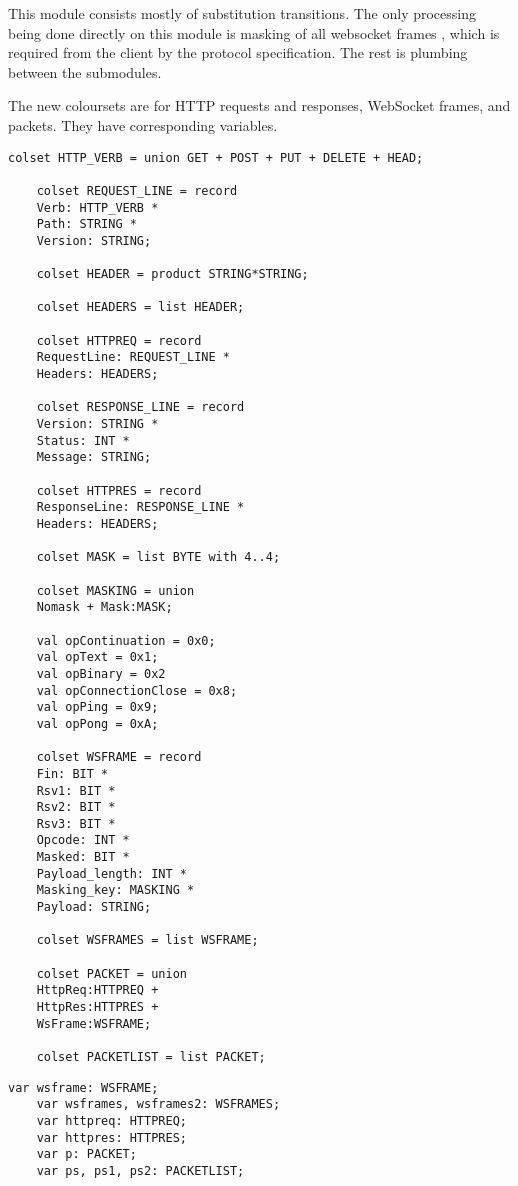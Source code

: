 
	This module consists mostly of substitution transitions. The only processing
	being done directly on this module is masking of all websocket frames
	, which is required from the client by the
	protocol specification.
	The rest is plumbing between the submodules.
	
	The new coloursets are for HTTP requests and responses, WebSocket frames, and
	packets. They have corresponding variables. 
	
	\begin{lstlisting}[label=lst:client_lib_colset,caption=Library colour
	sets,gobble=1]
	colset HTTP_VERB = union GET + POST + PUT + DELETE + HEAD;
	
	colset REQUEST_LINE = record
	Verb: HTTP_VERB *
	Path: STRING *
	Version: STRING;
	
	colset HEADER = product STRING*STRING;
	
	colset HEADERS = list HEADER;
	
	colset HTTPREQ = record
	RequestLine: REQUEST_LINE *
	Headers: HEADERS;
	
	colset RESPONSE_LINE = record
	Version: STRING *
	Status: INT *
	Message: STRING;
	
	colset HTTPRES = record
	ResponseLine: RESPONSE_LINE *
	Headers: HEADERS;
	
	colset MASK = list BYTE with 4..4;
	
	colset MASKING = union
	Nomask + Mask:MASK;
	
	val opContinuation = 0x0;
	val opText = 0x1;
	val opBinary = 0x2
	val opConnectionClose = 0x8;
	val opPing = 0x9;
	val opPong = 0xA;
	
	colset WSFRAME = record
	Fin: BIT *
	Rsv1: BIT *
	Rsv2: BIT *
	Rsv3: BIT *
	Opcode: INT *
	Masked: BIT *
	Payload_length: INT *
	Masking_key: MASKING *
	Payload: STRING;
	
	colset WSFRAMES = list WSFRAME;
	
	colset PACKET = union 
	HttpReq:HTTPREQ + 
	HttpRes:HTTPRES +
	WsFrame:WSFRAME;

	colset PACKETLIST = list PACKET;
	\end{lstlisting}
	
	\begin{lstlisting}[label=lst:client_lib_vars,caption=Library
	variables,gobble=1]
	var wsframe: WSFRAME;
	var wsframes, wsframes2: WSFRAMES;
	var httpreq: HTTPREQ;
	var httpres: HTTPRES;
	var p: PACKET;
	var ps, ps1, ps2: PACKETLIST;
	\end{lstlisting}
	
